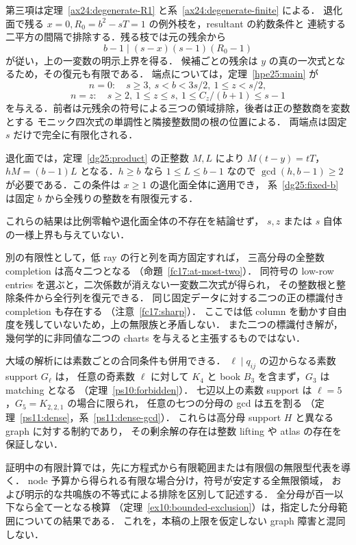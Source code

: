 第三項は定理~\ref{ax24:degenerate-R1} と系~\ref{ax24:degenerate-finite} による．
退化面で残る $x=0,R_0=b^2-sT=1$ の例外枝を，resultant の約数条件と
連続する二平方の間隔で排除する．残る枝では元の残余から
\[
 b-1\mid(s-x)(s-1)(R_0-1)
\]
が従い，上の一変数の明示上界を得る．
候補ごとの残余は $y$ の真の一次式となるため，その復元も有限である．
端点については，定理~\ref{hpe25:main} が
\[
 n=0:\quad s\ge3,\ s<b<3s/2,\ 1\le z<s/2,
\]
\[
 n=z:\quad s\ge2,\ 1\le z\le s,\ 1\le C_z/(b+1)\le s-1
\]
を与える．前者は元残余の符号による三つの領域排除，後者は正の整数商を変数とする
モニック四次式の単調性と隣接整数間の根の位置による．
両端点は固定 $s$ だけで完全に有限化される．

退化面では，定理~\ref{dg25:product} の正整数 $M,L$ により
$M(t-y)=tT$，$hM=(b-1)L$ となる．$h\ge b$ なら $1\le L\le b-1$ なので
$\gcd(h,b-1)\ge2$ が必要である．この条件は $x\ge1$ の退化面全体に適用でき，
系~\ref{dg25:fixed-b} は固定 $b$ から全残りの整数を有限復元する．

これらの結果は比例零軸や退化面全体の不存在を結論せず，
$s,z$ または $s$ 自体の一様上界も与えていない．

別の有限性として，低 ray の行と列を両方固定すれば，
三高分母の全整数 completion は高々二つとなる
（命題~\ref{fc17:at-most-two}）．
同符号の low-row entries を選ぶと，二次係数が消えない一変数二次式が得られ，
その整数根と整除条件から全行列を復元できる．
同じ固定データに対する二つの正の標識付き completion も存在する
（注意~\ref{fc17:sharp}）．
ここでは低 column を動かす自由度を残していないため，上の無限族と矛盾しない．
また二つの標識付き解が，幾何学的に非同値な二つの charts を与えると主張するものではない．

大域の解析には素数ごとの合同条件も併用できる．
$\ell\mid q_{ij}$ の辺からなる素数 support $G_\ell$ は，
任意の奇素数 $\ell$ に対して $K_4$ と book $B_3$ を含まず，$G_3$ は matching となる
（定理~\ref{ps10:forbidden}）．
七辺以上の素数 support は $\ell=5$，$G_5=K_{2,2,1}$ の場合に限られ，
任意の七つの分母の gcd は五を割る
（定理~\ref{ps11:dense}，系~\ref{ps11:dense-gcd}）．
これらは高分母 support $H$ と異なる graph に対する制約であり，
その剰余解の存在は整数 lifting や atlas の存在を保証しない．

証明中の有限計算では，先に方程式から有限範囲または有限個の無限型代表を導く．
node 予算から得られる有限な場合分け，符号が安定する全無限領域，
および明示的な共鳴族の不等式による排除を区別して記述する．
全分母が百一以下なら全て一となる検算
（定理~\ref{ex10:bounded-exclusion}）は，指定した分母範囲についての結果である．
これを，本稿の上限を仮定しない graph 障害と混同しない．

